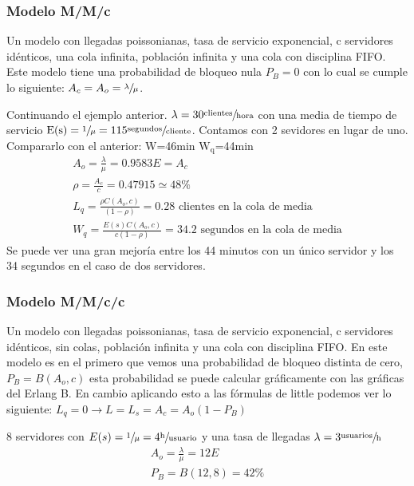 \subsubsection{Modelo M/M/c}
Un modelo con llegadas poissonianas, tasa de servicio exponencial, c servidores idénticos, una cola infinita, población infinita y una cola con disciplina FIFO. Este modelo tiene una probabilidad de bloqueo nula $P_B=0$ con lo cual se cumple lo siguiente: $A_c=A_o=\sfrac{\lambda}{\mu}$.\\
\begin{example}[M/M/c]
Continuando el ejemplo anterior. $\lambda=30\sfrac{\text{clientes}}{\text{hora}}$ con una media de tiempo de servicio $\text{E(s)}=\sfrac{1}{\mu}=115\sfrac{\text{segundos}}{\text{cliente}}$. Contamos con 2 sevidores en lugar de uno. Compararlo con el anterior: W=46min $\text{W}_{\text{q}}$=44min\\
\begin{gather*}
A_o=\frac{\lambda}{\mu}=0.9583E=A_c\\
\rho=\frac{A_c}{c}=0.47915\simeq 48\% \\
L_q=\frac{\rho C(A_o,c)}{(1-\rho)}=0.28\text{ clientes en la cola de media}\\
W_q=\frac{E(s)C(A_o,c)}{c(1-\rho)}=34.2\text{ segundos en la cola de media}
\end{gather*}
Se puede ver una gran mejoría entre los 44 minutos con un único servidor y los 34 segundos en el caso de dos servidores.
\end{example}
\subsubsection{Modelo M/M/c/c}
Un modelo con llegadas poissonianas, tasa de servicio exponencial, c servidores idénticos, sin colas, población infinita y una cola con disciplina FIFO. En este modelo es en el primero que vemos una probabilidad de bloqueo distinta de cero, $P_B=B(A_o,c)$ esta probabilidad se puede calcular gráficamente con las gráficas del Erlang B. En cambio aplicando esto a las fórmulas de little podemos ver lo siguiente: $L_q=0\to L=L_s=A_c=A_o(1-P_B)$\\
\begin{example}[M/M/c/c]
8 servidores con $E(s)=\sfrac{1}{\mu}=4\sfrac{\text{h}}{\text{usuario}}$ y una tasa de llegadas $\lambda=3\sfrac{\text{usuarios}}{\text{h}}$\\
\begin{gather*}
A_o=\frac{\lambda}{\mu}=12E\\
P_B=B(12,8)=42\%
\end{gather*}
\end{example}
